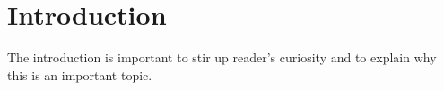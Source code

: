 \chapter{Introduction}\label{chapterIntroduction}

The introduction is important to stir up reader's curiosity and to explain why this is an important topic.\\
\ \\
\ \\

\Blindtext
